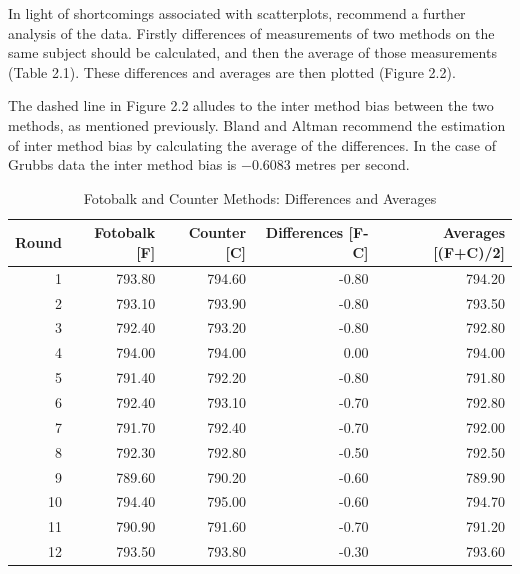 \documentclass[12pt, a4paper]{report}
\theoremstyle{plain}
\theoremstyle{definition}
\theoremstyle{remark}
\begin{document}
	In light of shortcomings associated with scatterplots,
	\citet*{BA83} recommend a further analysis of the data. Firstly
	differences of measurements of two methods on the same subject
	should  be calculated, and then the average of those measurements
	(Table 2.1). These differences and averages are then plotted
	(Figure 2.2).
	
	
	
	
	The dashed line in Figure 2.2 alludes to the inter method bias
	between the two methods, as mentioned previously. Bland and Altman
	recommend the estimation of inter method bias by calculating the
	average of the differences. In the case of Grubbs data the inter
	method bias is $-0.6083$ metres per second.
	\newpage
	
	\begin{table}[tbh]
		\begin{center}
			
			\begin{tabular}{rrrrr}
				\hline
				Round & Fotobalk [F] & Counter [C] & Differences [F-C] & Averages [(F+C)/2] \\
				\hline
				1 & 793.80 & 794.60 & -0.80 & 794.20 \\
				2 & 793.10 & 793.90 & -0.80 & 793.50 \\
				3 & 792.40 & 793.20 & -0.80 & 792.80 \\
				4 & 794.00 & 794.00 & 0.00 & 794.00 \\
				5 & 791.40 & 792.20 & -0.80 & 791.80 \\
				6 & 792.40 & 793.10 & -0.70 & 792.80 \\
				7 & 791.70 & 792.40 & -0.70 & 792.00 \\
				8 & 792.30 & 792.80 & -0.50 & 792.50 \\
				9 & 789.60 & 790.20 & -0.60 & 789.90 \\
				10 & 794.40 & 795.00 & -0.60 & 794.70 \\
				11 & 790.90 & 791.60 & -0.70 & 791.20 \\
				12 & 793.50 & 793.80 & -0.30 & 793.60 \\
				\hline
			\end{tabular}
			\caption{Fotobalk and Counter Methods: Differences and Averages}
		\end{center}
	\end{table}
	
\end{document}
